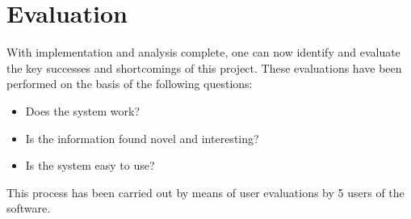 \chapter{Evaluation}
\label{cha:eval}
With implementation and analysis complete, one can now identify and evaluate the key successes and shortcomings of this project. These evaluations have been performed on the basis of the following questions:

\begin{itemize}
\item Does the system work?
\item Is the information found novel and interesting?
\item Is the system easy to use?
\end{itemize}

This process has been carried out by means of user evaluations by 5 users of the software.